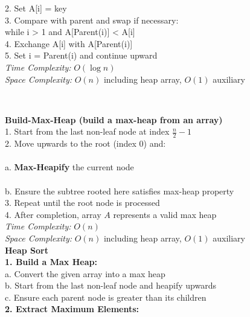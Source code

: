 \documentclass[a4paper]{extarticle}
\newcommand{\algofont}{\fontsize{4.3pt}{4.7pt}\selectfont}
\newcommand{\algocode}[1]{%
  \vspace{0pt}%
  \begin{algorithm}[H]
    \setlength{\abovecaptionskip}{0pt}%
    \setlength{\belowcaptionskip}{0pt}
    \setlength{\intextsep}{0pt}%
    \setlength{\textfloatsep}{0pt}
    \algofont  %
  \end{algorithm}%
  \vspace{0pt}%
}
\begin{document}
\begin{paracol}{3}
{\begin{minipage}[t]{1\linewidth}
\begin{minipage}[t]{0.67\textwidth}
          2. Set A[i] = key\\
          3. Compare with parent and swap if necessary: \\ while i > 1 and A[Parent(i)] < A[i]\\
          4. Exchange A[i] with A[Parent(i)]\\
          5. Set i = Parent(i) and continue upward\\
          \textit{Time Complexity:} \(O(\log n)\) \\ \textit{Space Complexity:} \(O(n)\) including heap array, \(O(1)\) auxiliary
    \end{minipage}
    \begin{minipage}[t]{0.32\textwidth}
      \vspace*{-16px}
      \algocode{heap-increase-key}
      \vspace*{-15px}
    \end{minipage}\\
   \begin{minipage}[t]{0.67\textwidth}
          \noindent \textbf{ Build-Max-Heap (build a max-heap from an array)}\\
          1. Start from the last non-leaf node at index \(\frac{n}{2} - 1\)\\
          2. Move upwards to the root (index \(0\)) and:\\
          \\ a. \textbf{Max-Heapify} the current node\\
          \\ b. Ensure the subtree rooted here satisfies max-heap property\\
          3. Repeat until the root node is processed\\
          4. After completion, array \(A\) represents a valid max heap\\
          \textit{Time Complexity:} \(O(n)\) \\ \textit{Space Complexity:} \(O(n)\) including heap array, \(O(1)\) auxiliary\\
          \textbf{ Heap Sort}\\
          \textbf{1. Build a Max Heap:}\\
          a. Convert the given array into a max heap\\
          b. Start from the last non-leaf node and heapify upwards\\
          c. Ensure each parent node is greater than its children\\
          \textbf{2. Extract Maximum Elements:}\\

\end{minipage}
\end{minipage}}
\end{paracol}
\end{document}
